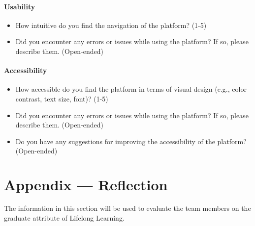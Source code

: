 \documentclass[12pt, titlepage]{article}
\begin{document}
\paragraph{Usability}
\begin{itemize}
    \item{How intuitive do you find the navigation of the platform? (1-5)}
    \item{Did you encounter any errors or issues while using the platform? If so, please describe them. (Open-ended)}
\end{itemize}


\paragraph{Accessibility}
\begin{itemize}
    \item{How accessible do you find the platform in terms of visual design (e.g., color contrast, text size, font)? (1-5)}
    \item{Did you encounter any errors or issues while using the platform? If so, please describe them. (Open-ended)}
    \item{Do you have any suggestions for improving the accessibility of the platform?
          (Open-ended)}
\end{itemize}

\newpage{}
\section*{Appendix --- Reflection}

The information in this section will be used to evaluate the team members on the
graduate attribute of Lifelong Learning.


\end{document}
